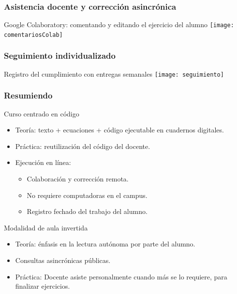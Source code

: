 \documentclass[aspectratio=43]{beamer}
\begin{document}
\begin{frame}
	\frametitle{Asistencia docente y corrección asincrónica}
	\begin{block}{Google Colaboratory: comentando y editando el ejercicio del alumno}
		\texttt{[image: comentariosColab]}
	\end{block}
\end{frame}


\begin{frame}
	\frametitle{Seguimiento individualizado}
	\begin{block}{Registro del cumplimiento con entregas semanales}
		\texttt{[image: seguimiento]}
	\end{block}
\end{frame}


\begin{frame}
	\frametitle{Resumiendo}
	\begin{block}{Curso centrado en código}
		\begin{itemize}[<+->]
			\item Teoría: texto + ecuaciones + código ejecutable en cuadernos digitales.
			\item Práctica: reutilización del código del docente.
			\item Ejecución en línea:
			\begin{itemize}[<+->]
				\item Colaboración y corrección remota.
				\item No requiere computadoras en el campus.
				\item Registro fechado del trabajo del alumno.
			\end{itemize}
		\end{itemize}
	\end{block}
	\begin{block}{Modalidad de aula invertida}
		\begin{itemize}[<+->]
			\item Teoría: énfasis en la lectura autónoma por parte del alumno.
			\item Consultas asincrónicas públicas.
			\item Práctica: Docente asiste personalmente cuando más se lo requiere, para finalizar ejercicios.
		\end{itemize}
	\end{block}
\end{frame}
	
\end{document}
